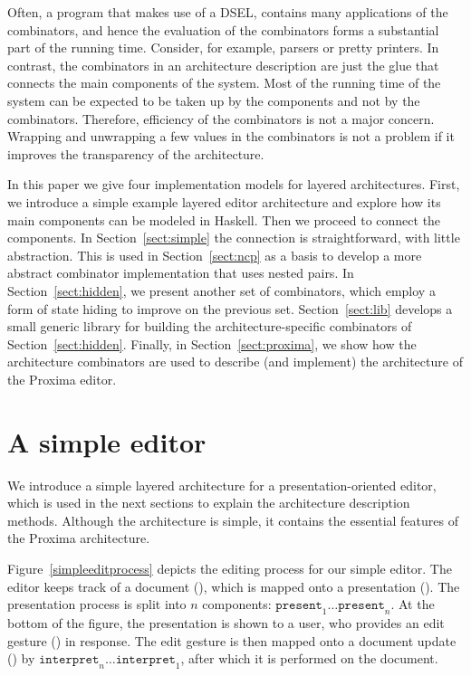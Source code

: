 \documentclass[preprint,natbib]{sigplanconf}
\begin{document}
Often, a program that makes use of a DSEL, contains many applications of the combinators, and hence the evaluation of the combinators forms a substantial part of the running time. Consider, for example, parsers or pretty printers. In contrast, the combinators in an architecture description are just the glue that connects the main components of the system. Most of the running time of the system can be expected to be taken up by the components and not by the combinators. Therefore, efficiency of the combinators is not a major concern. Wrapping and unwrapping a few values in the combinators is not a problem if it improves the transparency of the architecture.

In this paper we give four implementation models for layered architectures. First, we introduce a simple example layered editor architecture and explore how its main components can be modeled in Haskell. Then we proceed to connect the components. In Section~\ref{sect:simple} the connection is straightforward, with little abstraction. This is used in Section~\ref{sect:ncp} as a basis to develop a more abstract combinator implementation that uses nested pairs. In Section~\ref{sect:hidden}, we present another set of combinators, which employ a form of state hiding to improve on the previous set. Section~\ref{sect:lib} develops a small generic library for building the architecture-specific combinators of Section~\ref{sect:hidden}. 
\bc
Finally, in Section~\ref{sect:proxima}, we show how the architecture combinators are used to describe (and implement) the architecture of  the Proxima editor.%
\ec


%																
%																
%																
\section{A simple editor}


We introduce a simple layered architecture for a presentation-oriented editor, which is used in the next sections to explain the architecture description methods. Although the architecture is simple, it contains the essential features of the Proxima architecture. 


Figure~\ref{simpleeditprocess} depicts the editing process for our simple editor. The editor keeps track of a document (), which is mapped onto a presentation (). The presentation process is split into $n$ components: $\mathtt{present}_1 \dots \mathtt{present}_{n}$. At the bottom of the figure, the presentation is shown to a user, who provides an edit gesture () in response. The edit gesture is then mapped onto a document update () by $\mathtt{interpret}_{n} \dots \mathtt{interpret}_1$, after which it is performed on the document.
\end{document}
